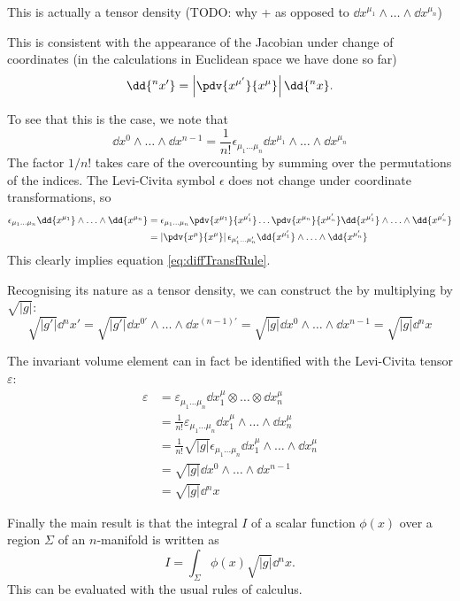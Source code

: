 This is actually a tensor density (TODO: why + as opposed to $\dd{x^{\mu_1}}\wedge \ldots \wedge \dd{x^{\mu_n}}$)

This is consistent with the appearance of the Jacobian under change of coordinates (in the calculations in Euclidean space we have done so far) 
\[ \dd{^nx'} = \left|\pdv{x^{\mu'}}{x^\mu}\right|\dd{^nx}. \]

To see that this is the case, we note that
\[ \dd{x^0}\wedge \ldots \wedge \dd{x^{n-1}} = \frac{1}{n!}\epsilon_{\mu_1\ldots\mu_n}\dd{x^{\mu_1}}\wedge \ldots \wedge \dd{x^{\mu_n}} \]
The factor $1/n!$ takes care of the overcounting by summing over the permutations of the indices. The Levi-Civita symbol $\epsilon$ does not change under coordinate transformations, so
\begin{align*}
\epsilon_{\mu_1\ldots\mu_n}\dd{x^{\mu_1}}\wedge \ldots \wedge \dd{x^{\mu_n}} &= \epsilon_{\mu_1\ldots\mu_n} \pdv{x^{\mu_1}}{x^{\mu'_1}}\ldots\pdv{x^{\mu_n}}{x^{\mu'_n}}\dd{x^{\mu'_1}}\wedge \ldots \wedge \dd{x^{\mu'_n}} \\
&= \left|\pdv{x^\mu}{x^{\mu}}\right|\epsilon_{\mu'_1\ldots\mu'_n}\dd{x^{\mu'_1}}\wedge \ldots \wedge \dd{x^{\mu'_n}}
\end{align*}
This clearly implies equation \ref{eq:diffTransfRule}.

Recognising its nature as a tensor density, we can construct the  by multiplying by $\sqrt{|g|}$:
\[ \sqrt{|g'|}\dd{^nx'} = \sqrt{|g'|}\dd{x^{0'}}\wedge \ldots \wedge \dd{x^{(n-1)' }} = \sqrt{|g|}\dd{x^0}\wedge \ldots \wedge \dd{x^{n-1}} = \sqrt{|g|}\dd{^nx} \]

The invariant volume element can in fact be identified with the Levi-Civita tensor $\varepsilon$:
\begin{align*}
\varepsilon &= \varepsilon_{\mu_1\ldots\mu_n}\dd{x^\mu_1}\otimes \ldots\otimes \dd{x^\mu_n} \\
&= \frac{1}{n!}\varepsilon_{\mu_1\ldots\mu_n}\dd{x^\mu_1}\wedge \ldots\wedge \dd{x^\mu_n} \\
&= \frac{1}{n!}\sqrt{|g|}\epsilon_{\mu_1\ldots\mu_n}\dd{x^\mu_1}\wedge \ldots\wedge \dd{x^\mu_n} \\
&= \sqrt{|g|}\dd{x^0}\wedge \ldots\wedge \dd{x^{n-1}} \\
&= \sqrt{|g|}\dd{^nx}
\end{align*}

Finally the main result is that the integral $I$ of a scalar function $\phi(x)$ over a region $\Sigma$ of an $n$-manifold is written as
\[ \boxed{I = \int_\Sigma\phi(x) \sqrt{|g|} \dd{^n}x. } \]
This can be evaluated with the usual rules of calculus.


